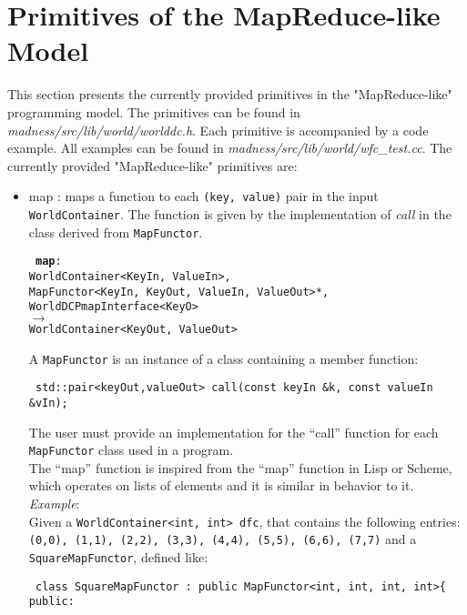 \documentclass{article}
\begin{document}
\section{Primitives of the MapReduce-like Model}

This section presents the currently provided primitives in the
"MapReduce-like" programming model.  The primitives can be found in {\em
madness/src/lib/world/worlddc.h}.  Each primitive is accompanied by a code
example. All examples can be found in {\em
madness/src/lib/world/wfc\_test.cc}.  The currently provided "MapReduce-like"
primitives are:

\begin{itemize}

  \item map : maps a function to each {\tt (key, value)} pair in the 
    input {\tt WorldContainer}.
    The function is given by the implementation of {\em call} in the
    class derived from {\tt MapFunctor}.

    {\tt
    {\bf map}:\\ 
    WorldContainer<KeyIn, ValueIn>,\\
    MapFunctor<KeyIn, KeyOut, ValueIn, ValueOut>*,\\
    WorldDCPmapInterface<KeyO>\\
    $\rightarrow$\\
    WorldContainer<KeyOut, ValueOut>\\
    }

    A {\tt MapFunctor} is an instance of a class containing a member function:

    {\tt
    std::pair<keyOut,valueOut> call(const keyIn \&k, const valueIn \&vIn);\\
    }

    The user must provide an implementation for the ``call'' function for each
{\tt MapFunctor} class used in a program.\\

    The ``map'' function is inspired from the ``map'' function in Lisp or
Scheme, which operates on lists of elements  and it is similar in behavior to
it.\\

    {\em Example}:\\
    Given a {\tt WorldContainer<int, int> dfc}, that contains the following
    entries: {\tt (0,0), (1,1), (2,2), (3,3), (4,4), (5,5), (6,6), (7,7)} and
    a {\tt SquareMapFunctor}, defined like:\\
    {\tt
     class SquareMapFunctor : public MapFunctor<int, int, int, int>\{\\
       public:
     
}
\end{itemize}
\end{document}
